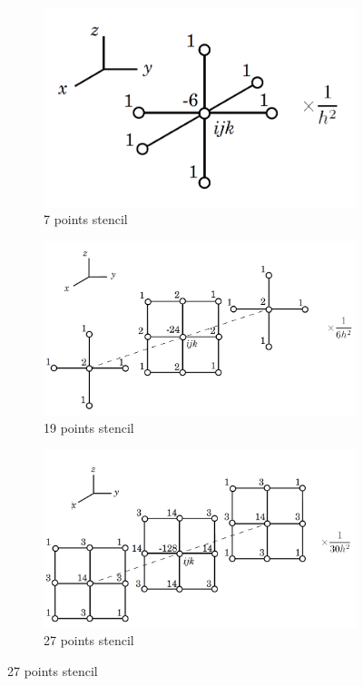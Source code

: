 \begin{figure}[t]
	\centering
	\begin{subfigure}[b]{0.45\textwidth}
		\centering
		\includegraphics[width=\textwidth]{pictures/3/stencil7}
		\caption{7 points stencil}
		\label{fig:stencil7}
	\end{subfigure}
	\hfill
	\begin{subfigure}[b]{0.45\textwidth}
		\centering
		\includegraphics[width=\textwidth]{pictures/3/stencil19}
		\caption{19 points stencil}
		\label{fig:stencil19}
	\end{subfigure}
	\hfill
	\bigskip
	
	\begin{subfigure}[b]{0.45\textwidth}
		\centering
		\includegraphics[width=\textwidth]{pictures/3/stencil27}
		\caption{27 points stencil}
		\label{fig:stencil27}
	\end{subfigure}
	\hfill
	

\end{figure}
